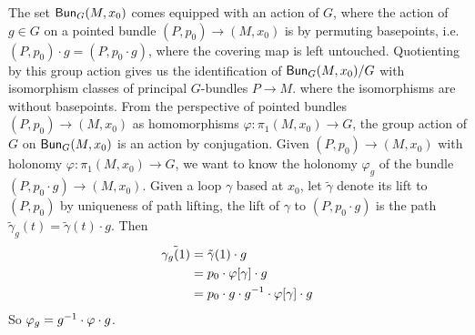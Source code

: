 %
The set $\mathsf{Bun}_G(M, x_0)$ comes equipped with an action of $G$, where the action
of $g \in G$ on a pointed bundle $(P, p_0) \to (M, x_0)$  is by permuting basepoints,
i.e. $(P, p_0) \cdot g = (P, p_0 \cdot g)$, where the covering map is left untouched.
Quotienting by this group action gives us the identification of $\mathsf{Bun}_G(M,x_0) / G$
with isomorphism classes of principal $G$-bundles $P \to M$. where the
isomorphisms are without basepoints. From the perspective of pointed bundles
$(P,p_0) \to (M, x_0)$ as homomorphisms $\varphi : \pi_1(M, x_0) \to G$,
the group action of $G$ on $\mathsf{Bun}_G(M,x_0)$ is an action by conjugation.
Given $(P, p_0) \to (M, x_0)$ with holonomy $\varphi : \pi_1(M, x_0) \to G$,
we want to know the holonomy $\varphi_g$ of the bundle
$(P, p_0 \cdot g) \to (M, x_0)$. Given a loop $\gamma$ based at $x_0$, let
$\tilde{\gamma}$ denote its lift to $(P, p_0)$ by uniqueness of path lifting,
the lift of $\gamma$ to $(P, p_0 \cdot g)$ is the path
$\tilde{\gamma}_g(t) = \tilde{\gamma}(t) \cdot g$. Then
%
\begin{align*}
\tilde{\gamma_g(1)} &= \tilde{\gamma}(1) \cdot g \\
&= p_0 \cdot \varphi[\gamma] \cdot g \\
&= p_0 \cdot g \cdot g^{-1} \cdot \varphi[\gamma] \cdot g
\end{align*}
%
So $\varphi_g = g ^{-1}\cdot\varphi\cdot g$.
%
